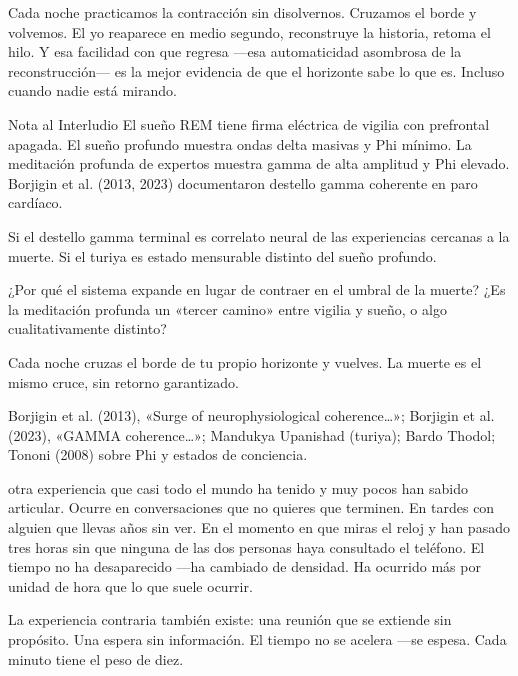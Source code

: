 Cada noche practicamos la contracción sin disolvernos. Cruzamos el borde y volvemos. El yo reaparece en medio segundo, reconstruye la historia, retoma el hilo. Y esa facilidad con que regresa —esa automaticidad asombrosa de la reconstrucción— es la mejor evidencia de que el horizonte sabe lo que es. Incluso cuando nadie está mirando.

\begin{notacap}{Nota al Interludio}
 El sueño REM tiene firma eléctrica de vigilia con prefrontal apagada. El sueño profundo muestra ondas delta masivas y Phi mínimo. La meditación profunda de expertos muestra gamma de alta amplitud y Phi elevado. Borjigin et al. (2013, 2023) documentaron destello gamma coherente en paro cardíaco.

 Si el destello gamma terminal es correlato neural de las experiencias cercanas a la muerte. Si el turiya es estado mensurable distinto del sueño profundo.

 ¿Por qué el sistema expande en lugar de contraer en el umbral de la muerte? ¿Es la meditación profunda un «tercer camino» entre vigilia y sueño, o algo cualitativamente distinto?

 Cada noche cruzas el borde de tu propio horizonte y vuelves. La muerte es el mismo cruce, sin retorno garantizado.

 Borjigin et al. (2013), «Surge of neurophysiological coherence…»; Borjigin et al. (2023), «GAMMA coherence…»; Mandukya Upanishad (turiya); Bardo Thodol; Tononi (2008) sobre Phi y estados de conciencia.
\end{notacap}
\noindent {} otra experiencia que casi todo el mundo ha tenido y muy pocos han sabido articular. Ocurre en conversaciones que no quieres que terminen. En tardes con alguien que llevas años sin ver. En el momento en que miras el reloj y han pasado tres horas sin que ninguna de las dos personas haya consultado el teléfono. El tiempo no ha desaparecido —ha cambiado de densidad. Ha ocurrido más por unidad de hora que lo que suele ocurrir.

La experiencia contraria también existe: una reunión que se extiende sin propósito. Una espera sin información. El tiempo no se acelera —se espesa. Cada minuto tiene el peso de diez.

